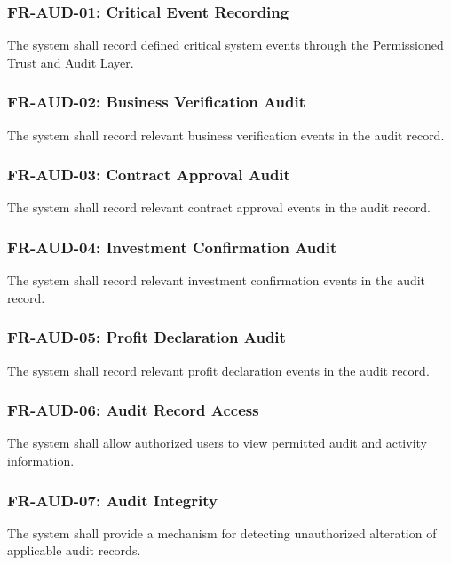\subsubsection{FR-AUD-01: Critical Event Recording}

The system shall record defined critical system events through the
Permissioned Trust and Audit Layer.

\subsubsection{FR-AUD-02: Business Verification Audit}

The system shall record relevant business verification events in the audit
record.

\subsubsection{FR-AUD-03: Contract Approval Audit}

The system shall record relevant contract approval events in the audit
record.

\subsubsection{FR-AUD-04: Investment Confirmation Audit}

The system shall record relevant investment confirmation events in the
audit record.

\subsubsection{FR-AUD-05: Profit Declaration Audit}

The system shall record relevant profit declaration events in the audit
record.

\subsubsection{FR-AUD-06: Audit Record Access}

The system shall allow authorized users to view permitted audit and activity
information.

\subsubsection{FR-AUD-07: Audit Integrity}

The system shall provide a mechanism for detecting unauthorized alteration
of applicable audit records.


